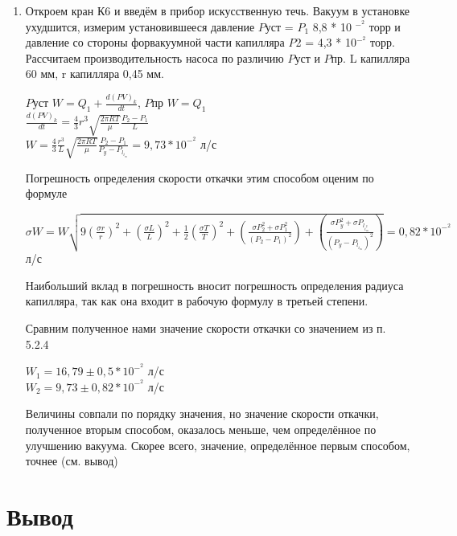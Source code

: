 \documentclass[a4paper]{article}
\begin{document}
\begin{enumerate}
\item Откроем кран К6 и введём в прибор искусственную течь. Вакуум в установке ухудшится, измерим установившееся давление $P$уст = $P_1$ 8,8 * 10 $^-^2$ торр и давление со стороны форвакуумной части капилляра $P$2 = 4,3 * 10$^-^2$ торр. Рассчитаем производительность насоса по различию $P$уст и $P$пр. L капилляра 60 мм, r капилляра 0,45 мм.
\begin{center}
$P$уст $W = Q_1 + \frac{d(PV)_k}{dt}$, $P$пр $W = Q_1$\\
$\frac{d(PV)_k}{dt} = \frac{4}{3}r^3 \sqrt{\frac{2\pi RT}{\mu}}\frac{P_2-P_1}{L}$\\
$W = \frac{4}{3}\frac{r^3}{L}\sqrt{\frac{2\pi R T}{\mu}}\frac{P_2-P_1}{P_y - P_l_i_m} = 9,73 * 10^-^2$ л/с
\end{center}

Погрешность определения скорости откачки этим способом оценим по формуле
\begin{center}
$\sigma W = W\sqrt{9(\frac{\sigma r}{r})^2+(\frac{\sigma L}{L})^2+\frac{1}{2}(\frac{\sigma T}{T})^2+(\frac{\sigma P_2^2 + \sigma P_1^2}{(P_2-P_1)^2})+(\frac{\sigma P_y^2 + \sigma P_l_i_m^2}{(P_y-P_l_i_m)^2})} = 0,82 * 10^-^2$ л/с
\end{center}
Наибольший вклад в погрешность вносит погрешность определения радиуса капилляра, так как она входит в рабочую формулу в третьей степени. 

Сравним полученное нами значение скорости откачки со значением из п. 5.2.4

\begin{center}
$W_1 = 16,79 \pm 0,5 * 10^-^2$ л/с\\
$W_2 = 9,73 \pm 0,82 * 10^-^2$ л/с
\end{center}

Величины совпали по порядку значения, но значение скорости откачки, полученное вторым способом, оказалось меньше, чем определённое по улучшению вакуума. Скорее всего, значение, определённое первым способом, точнее (см. вывод) 
       
\end{enumerate}

\section{Вывод}
\end{document}

